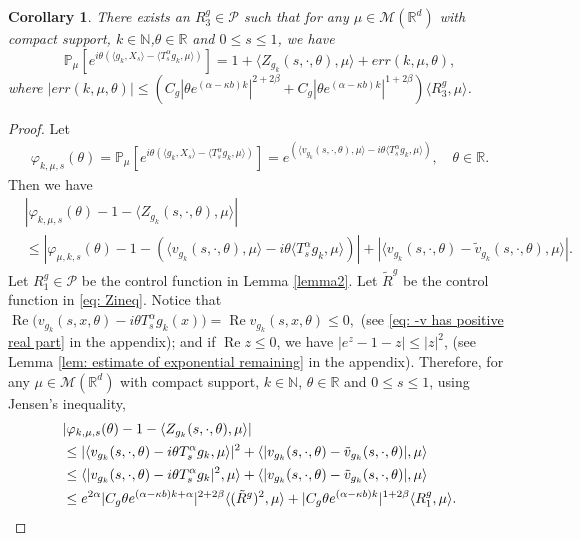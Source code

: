 \documentclass[12pt,oneside,english]{amsart}
\theoremstyle{plain}
\newtheorem{cor}[thm]{Corollary}
\theoremstyle{definition}
\numberwithin{equation}{section}
\begin{document}
\begin{cor}
\label{cor: corollary1}
    There exists an $R^g_3 \in \mathcal{P}$ such that for any $\mu\in \mathcal M(\mathbb R^d)$ with compact support, $k \in \mathbb{N}$,$\theta \in \mathbb{R}$ and $0\leq s\leq 1$, we have
\[
    \mathbb P_{\mu}[e^{i\theta(\langle g_k, X_s\rangle-\langle T_s^{\alpha}g_k,\mu \rangle)}]
    =1+\langle Z_{g_k}(s,\cdot,\theta),\mu\rangle+ err(k,\mu,\theta),
\]
    where $|err(k,\mu,\theta)| \leq (C_g|\theta e^{(\alpha-\kappa b)k}|^{2+2\beta} + C_g|\theta e^{(\alpha-\kappa b)k}|^{1+2\beta} )\langle R^g_3,\mu\rangle$.
\end{cor}
\begin{proof}
    Let
\begin{align}
\label{eq: definition of varphi-mu-k-theta}
    \varphi_{k,\mu,s}(\theta)
    =\mathbb{P}_{\mu}[e^{i\theta(\langle g_k, X_s\rangle-\langle T_s^{\alpha}g_k,\mu \rangle)}]
    =e^{(\langle v_{g_k}(s,\cdot,\theta),\mu \rangle-i\theta \langle T_s^{\alpha} g_k, \mu \rangle)},
    \quad \theta \in \mathbb R.
\end{align}
    Then we have
\begin{align*}
    &|\varphi_{k,\mu,s}(\theta)-1-\langle Z_{g_k}(s,\cdot, \theta),\mu\rangle|\\
    &\leq|\varphi_{\mu,k,s}(\theta)-1-\left( \langle v_{g_k}(s,\cdot,\theta), \mu \rangle-i\theta \langle T_s^{\alpha}g_k,\mu\rangle\right)| + |\langle v_{g_k}(s,\cdot,\theta)-\tilde{v}_{g_k}(s,\cdot,\theta),\mu \rangle|.
\end{align*}
    Let $R^g_1\in \mathcal P$ be the control function in Lemma \ref{lemma2}.
    Let $\tilde R^g$ be the control function in \eqref{eq: Zineq}.
    Notice that
$
    \operatorname{Re} \big(v_{g_k}(s,x,\theta) - i\theta T_s^\alpha g_k(x)\big)
    = \operatorname{Re} v_{g_k}(s,x,\theta)
    \leq 0,
$
    (see \eqref{eq: -v has positive real part} in the appendix); and if $ \operatorname{Re} z\leq 0$, we have $|e^z-1-z|\leq |z|^2$, (see Lemma \ref{lem: estimate of exponential remaining} in the appendix).
    Therefore, for any $\mu\in \mathcal M(\mathbb R^d)$ with compact support, $k \in \mathbb{N}$, $\theta \in \mathbb{R}$ and $0\leq s\leq1$, using Jensen's inequality,
\begin{align*}
    &|\varphi_{k,\mu,s}(\theta)-1- \langle Z_{g_k}(s,\cdot, \theta),\mu\rangle|\\
    &\leq |\langle v_{g_k}(s,\cdot,\theta)-i\theta T_s^{\alpha}g_k, \mu \rangle|^2 + \langle |v_{g_k}(s,\cdot,\theta)-\tilde{v}_{g_k}(s,\cdot,\theta)|, \mu \rangle
    \\&\leq \langle |v_{g_k}(s,\cdot,\theta)-i\theta T_s^{\alpha}g_k|^2, \mu \rangle + \langle |v_{g_k}(s,\cdot,\theta)-\tilde{v}_{g_k}(s,\cdot,\theta)|, \mu \rangle
    \\&\leq e^{2\alpha}|C_g\theta e^{(\alpha-\kappa b)k+\alpha}|^{2+2\beta}\langle (\tilde R^g)^2,\mu\rangle + |C_g\theta e^{(\alpha-\kappa b)k}|^{1+2\beta}\langle R^g_1,\mu\rangle.
    \qedhere
\end{align*}
\end{proof}
\end{document}
